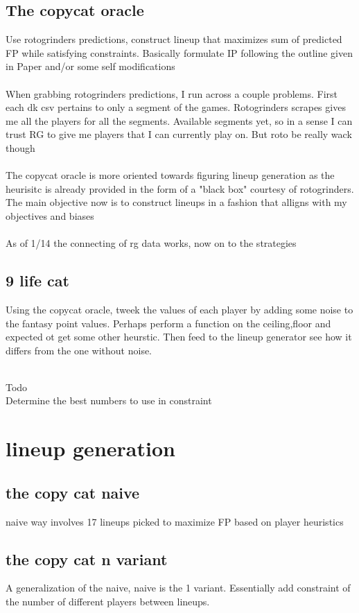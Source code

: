 \documentclass[11pt, oneside]{book}   	%
\begin{document}
\subsection{The copycat oracle}
Use rotogrinders predictions, construct lineup that maximizes sum of predicted FP while satisfying constraints. Basically formulate IP following the outline given in Paper and/or some self modifications\\
\\
When grabbing rotogrinders predictions, I run across a couple problems. First each dk csv pertains to only a segment of the games. Rotogrinders scrapes gives me all the players for all the segments. Available segments yet, so in a sense I can trust RG to give me players that I can currently play on. But roto be really wack though\\
\\
The copycat oracle is more oriented towards figuring lineup generation as the heurisitc is already provided in the form of a "black box" courtesy of rotogrinders. The main objective now is to construct lineups in a fashion that alligns with my objectives and biases\\
\\
As of 1/14 the connecting of rg data works, now on to the strategies\\
\subsection{9 life cat}
Using the copycat oracle, tweek the values of each player by adding some noise to the fantasy point values. Perhaps perform a function on the ceiling,floor and expected ot get some other heurstic. Then feed to the lineup generator see how it differs from the one without noise.


\\
Todo\\
Determine the best numbers to use in constraint


\section{lineup generation}


\subsection{the copy cat naive}
naive way involves 17 lineups picked to maximize FP based on player heuristics\\
\subsection{the copy cat n variant}
A generalization of the naive, naive is the 1 variant. Essentially add constraint of the number of different players between lineups.
\end{document}
